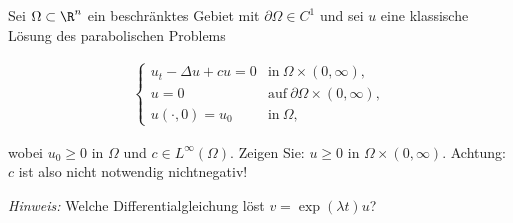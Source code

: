 
\begin{exercise}

Sei $\Omega \subset \R^n$ ein beschränktes Gebiet mit $\partial \Omega \in C^1$ und sei $u$ eine klassische Lösung des parabolischen Problems

\begin{align*}
  \begin{cases}
    u_t - \Delta u + c u = 0 & \text{in}~ \Omega \times (0, \infty), \\
    u = 0                    & \text{auf}~ \partial \Omega \times (0, \infty), \\
    u(\cdot, 0) = u_0        & \text{in}~ \Omega,
  \end{cases}
\end{align*}

wobei $u_0 \geq 0$ in $\Omega$ und $c \in L^\infty(\Omega)$.
Zeigen Sie:
$u \geq 0$ in $\Omega \times (0, \infty)$.
Achtung:
$c$ ist also nicht notwendig nichtnegativ!

\textit{Hinweis:}
Welche Differentialgleichung löst $v = \exp(\lambda t) u$?

\end{exercise}


